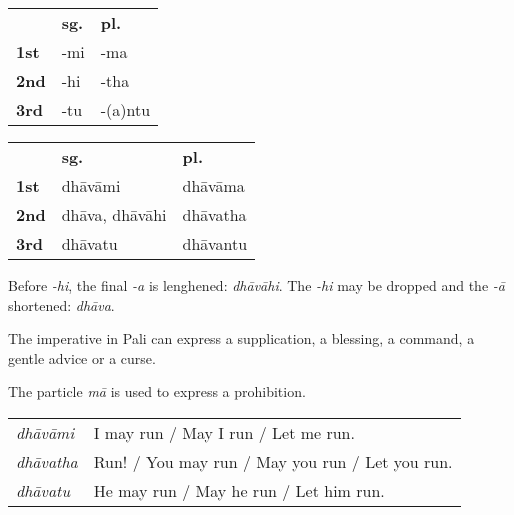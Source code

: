\documentclass[11pt,oneside]{memoir}
\begin{document}
{\centering\par
\begin{multicols}{2}

\begin{center}
\begin{tabular}{lll}
 & \textbf{sg.} & \textbf{pl.}\\[0pt]
\textbf{1st} & -mi & -ma\\[0pt]
\textbf{2nd} & -hi & -tha\\[0pt]
\textbf{3rd} & -tu & -(a)ntu\\[0pt]
\end{tabular}
\end{center}

\columnbreak

\begin{center}
\begin{tabular}{lll}
 & \textbf{sg.} & \textbf{pl.}\\[0pt]
\textbf{1st} & dhāvāmi & dhāvāma\\[0pt]
\textbf{2nd} & dhāva, dhāvāhi & dhāvatha\\[0pt]
\textbf{3rd} & dhāvatu & dhāvantu\\[0pt]
\end{tabular}
\end{center}

\end{multicols}
\par}

Before \emph{-hi}, the final \emph{-a} is lenghened: \emph{dhāvāhi}. The \emph{-hi} may be dropped and the \emph{-ā} shortened: \emph{dhāva}.

The imperative in Pali can express a supplication, a blessing, a command, a gentle advice or a curse.

The particle \emph{mā} is used to express a prohibition.

\begin{center}
\begin{tabular}{ll}
\emph{dhāvāmi} & I may run / May I run / Let me run.\\[0pt]
\emph{dhāvatha} & Run! / You may run / May you run / Let you run.\\[0pt]
\emph{dhāvatu} & He may run / May he run / Let him run.\\[0pt]
\end{tabular}
\end{center}

\renewcommand{\arraystretch}{1.8}
\end{document}
